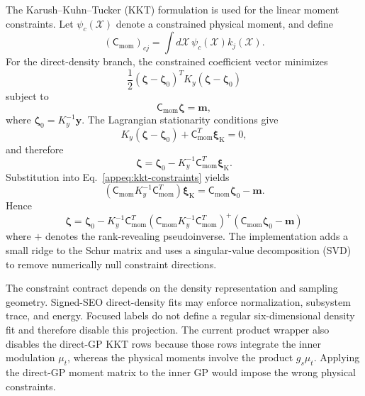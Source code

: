 \documentclass[
  11pt,
  letterpaper,
  onehalfspacing,
  normalmargins,
  equalmargins,
  oneside
]{ut-thesis}
\begin{document}
The Karush--Kuhn--Tucker (KKT) formulation is used for the linear moment
constraints. Let \(\psi_c(\boldsymbol{\mathcal X})\) denote a constrained physical moment,
and define
\begin{equation}
\left(\mathsf C_{\mathrm{mom}}\right)_{cj}
=
\int
d\boldsymbol{\mathcal X}\,
\psi_c(\boldsymbol{\mathcal X})
k_j(\boldsymbol{\mathcal X}).
\label{appeq:kkt-moment-matrix}
\end{equation}
For the direct-density branch, the constrained coefficient vector minimizes
\begin{equation}
\frac{1}{2}
\left(
\boldsymbol\zeta-\boldsymbol\zeta_0
\right)^T
K_y
\left(
\boldsymbol\zeta-\boldsymbol\zeta_0
\right)
\label{appeq:kkt-objective}
\end{equation}
subject to
\begin{equation}
\mathsf C_{\mathrm{mom}}\boldsymbol\zeta
=
\mathbf m,
\label{appeq:kkt-constraints}
\end{equation}
where
\(\boldsymbol\zeta_0=K_y^{-1}\mathbf y\).  The Lagrangian stationarity
conditions give
\[
K_y
\left(
\boldsymbol\zeta-\boldsymbol\zeta_0
\right)
+
\mathsf C_{\mathrm{mom}}^T\boldsymbol\xi_{\mathrm K}
=
0,
\]
and therefore
\[
\boldsymbol\zeta
=
\boldsymbol\zeta_0
-
K_y^{-1}\mathsf C_{\mathrm{mom}}^T
\boldsymbol\xi_{\mathrm K}.
\]
Substitution into Eq.~\eqref{appeq:kkt-constraints} yields
\[
\left(
\mathsf C_{\mathrm{mom}} K_y^{-1}\mathsf C_{\mathrm{mom}}^T
\right)
\boldsymbol\xi_{\mathrm K}
=
\mathsf C_{\mathrm{mom}}\boldsymbol\zeta_0-\mathbf m.
\]
Hence
\begin{equation}
\boldsymbol\zeta
=
\boldsymbol\zeta_0
-
K_y^{-1}\mathsf C_{\mathrm{mom}}^T
\left(
\mathsf C_{\mathrm{mom}} K_y^{-1}\mathsf C_{\mathrm{mom}}^T
\right)^{+}
\left(
\mathsf C_{\mathrm{mom}}\boldsymbol\zeta_0-\mathbf m
\right)
\label{appeq:kkt-solution}
\end{equation}
where \(+\) denotes the rank-revealing pseudoinverse.  The implementation adds
a small ridge to the Schur matrix and uses a singular-value decomposition
(SVD) to remove numerically null constraint directions.

The constraint contract depends on the density representation and sampling
geometry.  Signed-SEO direct-density fits may enforce normalization, subsystem
trace, and energy.  Focused labels do not define a regular six-dimensional
density fit and therefore disable this projection.  The current product
wrapper also disables the direct-GP KKT rows because those rows integrate the
inner modulation \(\mu_t\), whereas the physical moments involve the product
\(g_s\mu_t\).  Applying the direct-GP moment matrix to the inner GP would impose
the wrong physical constraints.
\end{document}
